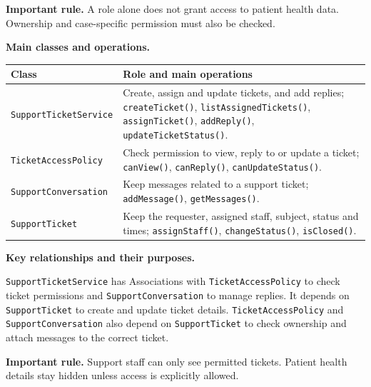 \noindent\textbf{Important rule.} A role alone does not grant access to patient
health data. Ownership and case-specific permission must also be checked.



\noindent\textbf{Main classes and operations.}\par\smallskip
\begingroup\small
\noindent\begin{tabularx}{\textwidth}{|L{0.34\textwidth}|Y|}
\hline
\textbf{Class} & \textbf{Role and main operations} \\ \hline
\texttt{SupportTicketService} & Create, assign and update tickets, and add replies; \texttt{createTicket()}, \texttt{listAssignedTickets()}, \texttt{assignTicket()}, \texttt{addReply()}, \texttt{updateTicketStatus()}. \\ \hline
\texttt{TicketAccessPolicy} & Check permission to view, reply to or update a ticket; \texttt{canView()}, \texttt{canReply()}, \texttt{canUpdateStatus()}. \\ \hline
\texttt{SupportConversation} & Keep messages related to a support ticket; \texttt{addMessage()}, \texttt{getMessages()}. \\ \hline
\texttt{SupportTicket} & Keep the requester, assigned staff, subject, status and times; \texttt{assignStaff()}, \texttt{changeStatus()}, \texttt{isClosed()}. \\ \hline
\end{tabularx}\par
\endgroup

\noindent\textbf{Key relationships and their purposes.}\par\smallskip
\texttt{SupportTicketService} has Associations with
\texttt{TicketAccessPolicy} to check ticket permissions and
\texttt{SupportConversation} to manage replies. It depends on
\texttt{SupportTicket} to create and update ticket details.
\texttt{TicketAccessPolicy} and \texttt{SupportConversation} also depend
on \texttt{SupportTicket} to check ownership and attach messages to the
correct ticket.

\noindent\textbf{Important rule.} Support staff can only see permitted tickets.
Patient health details stay hidden unless access is explicitly allowed.


